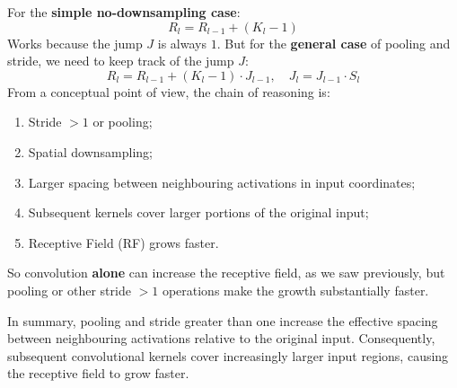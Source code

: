 \highspace
\begin{takeawaysbox}
    For the \textbf{simple no-downsampling case}:
    \begin{equation*}
        R_{l} = R_{l-1} + (K_{l} - 1)
    \end{equation*}
    Works because the jump $J$ is always $1$. But for the \textbf{general case} of pooling and stride, we need to keep track of the jump $J$:
    \begin{equation*}
        R_{l} = R_{l-1} + (K_{l} - 1) \cdot J_{l-1}, \quad J_{l} = J_{l-1} \cdot S_{l}
    \end{equation*}
    From a conceptual point of view, the chain of reasoning is:
    \begin{enumerate}
        \item Stride $> 1$ or pooling;
        \item Spatial downsampling;
        \item Larger spacing between neighbouring activations in input coordinates;
        \item Subsequent kernels cover larger portions of the original input;
        \item Receptive Field (RF) grows faster.
    \end{enumerate}
    So convolution \textbf{alone} can increase the receptive field, as we saw previously, but pooling or other stride $> 1$ operations make the growth substantially faster.

    \highspace
    In summary, pooling and stride greater than one increase the effective spacing between neighbouring activations relative to the original input. Consequently, subsequent convolutional kernels cover increasingly larger input regions, causing the receptive field to grow faster.
\end{takeawaysbox}

